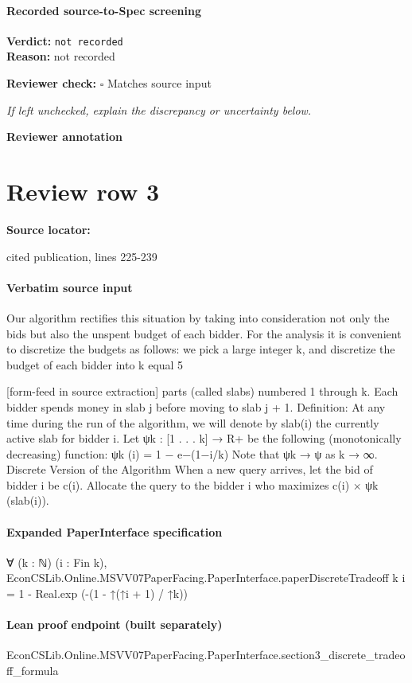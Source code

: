 \documentclass[10pt]{article}
\newcommand{\reviewerbox}{%
  \par\noindent\fbox{\parbox{0.96\linewidth}{\rule{0pt}{0.38in}}}\par
}
\newcommand{\reviewmatch}[1]{%
  \par\noindent\textbf{Reviewer check:} $\square$\; #1\par
  \noindent\emph{If left unchecked, explain the discrepancy or uncertainty below.}\par
}
\begin{document}
\paragraph{Recorded source-to-Spec screening}
\textbf{Verdict:} \texttt{not recorded}
\\
\textbf{Reason:} not recorded
\reviewmatch{Matches source input}
\noindent\textbf{Reviewer annotation}\par
\reviewerbox
\clearpage
\hypertarget{source-claim-7518c3e7c520074a}{}
\section*{Review row 3}
\textbf{Source locator:} {\footnotesize\raggedright cited publication, lines 225-\allowbreak{}239\par}
\paragraph{Verbatim source input}
\begin{ReviewVerbatim}
Our algorithm rectifies this situation by taking into consideration not only the bids but also
the unspent budget of each bidder. For the analysis it is convenient to discretize the budgets
as follows: we pick a large integer k, and discretize the budget of each bidder into k equal
5


[form-feed in source extraction]
parts (called slabs) numbered 1 through k. Each bidder spends money in slab j before moving
to slab j + 1.
Definition: At any time during the run of the algorithm, we will denote by slab(i) the
currently active slab for bidder i.
Let ψk : [1 . . . k] → R+ be the following (monotonically decreasing) function:
ψk (i) = 1 − e−(1−i/k)
Note that ψk → ψ as k → ∞.
Discrete Version of the Algorithm
When a new query arrives, let the bid of bidder i be c(i). Allocate the query to the
bidder i who maximizes c(i) × ψk (slab(i)).
\end{ReviewVerbatim}


\paragraph{Expanded PaperInterface specification}
\begin{ReviewVerbatim}
∀ (k : ℕ) (i : Fin k),
  EconCSLib.Online.MSVV07PaperFacing.PaperInterface.paperDiscreteTradeoff k i = 1 - Real.exp (-(1 - ↑(↑i + 1) / ↑k))
\end{ReviewVerbatim}

\paragraph{Lean proof endpoint (built separately)}\begin{ReviewVerbatim}
EconCSLib.Online.MSVV07PaperFacing.PaperInterface.section3_discrete_tradeoff_formula
\end{ReviewVerbatim}
\end{document}

